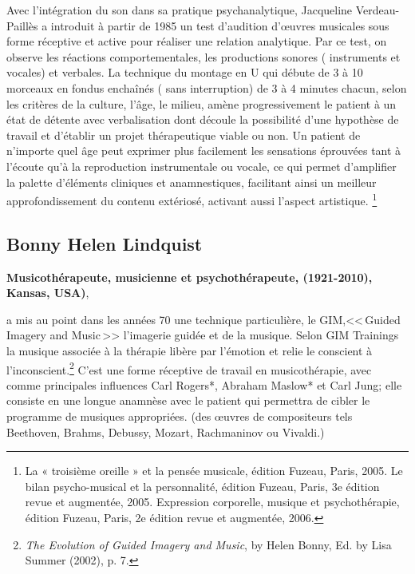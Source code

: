 Avec l'intégration du son dans sa pratique psychanalytique, 
Jacqueline Verdeau-Paillès a introduit  à partir de 1985  un test d'audition d'\oe uvres musicales
sous forme réceptive et active pour réaliser
une relation analytique\autocite{verdeau-pailles:bilan}.
Par ce test, on
observe les réactions comportementales, les productions sonores (
instruments et vocales) et verbales. La technique du montage en U qui débute de 3 à 10
morceaux en fondus enchaînés ( sans interruption) de 3 à 4 minutes chacun, selon les
critères de la culture, l'âge, le milieu,
amène progressivement le patient à un état de détente
avec verbalisation dont découle la possibilité 
d'une hypothèse de
travail et d'établir un projet thérapeutique viable ou non.
Un patient de n'importe quel âge peut exprimer plus facilement les
sensations éprouvées tant à l'écoute qu'à la reproduction
instrumentale ou vocale, ce qui permet d'amplifier la palette d'éléments
cliniques et anamnestiques, facilitant ainsi un meilleur approfondissement du
contenu extériosé, activant aussi l'aspect artistique.
\footnote{ La « troisième oreille » et la pensée musicale, édition Fuzeau, Paris, 2005.
Le bilan psycho-musical et la personnalité, édition Fuzeau, Paris, 3e édition revue et augmentée, 2005.
Expression corporelle, musique et psychothérapie, édition Fuzeau,
Paris, 2e édition revue et augmentée, 2006.} 



\subsection{Bonny Helen Lindquist} 

\textbf{ Musicothérapeute,
  musicienne et psychothérapeute, (1921-2010), Kansas, USA)},

a mis au point dans les années 70
une technique particulière, le GIM,<<\,Guided Imagery and Music\,>>
l'imagerie guidée et de la musique. Selon GIM
Trainings \autocite{gim_site} la
musique associée à la thérapie libère par l'émotion et relie le
conscient à l'inconscient.\footnote{\textsl{The Evolution of Guided Imagery and Music}, 
	by Helen Bonny, Ed. by Lisa Summer (2002), p. 7.}
 C'est une forme réceptive de travail
en musicothérapie, avec comme principales influences Carl Rogers*, Abraham Maslow* et Carl Jung; 
elle  consiste en une longue anamnèse avec le
patient qui permettra de cibler le programme de musiques appropriées. 
(des \oe uvres de compositeurs tels Beethoven, Brahms, Debussy,
Mozart, Rachmaninov ou Vivaldi.)






